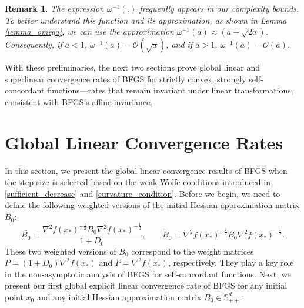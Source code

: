 \documentclass[11pt,letterpaper]{article}
\newcommand\0{{\Vector{0}}}
\newcommand\1{{\Vector{1}}}
\newtheorem{remark}{Remark}
\numberwithin{assumption}{section}
\numberwithin{definition}{section}
\numberwithin{theorem}{section}
\numberwithin{remark}{section}
\begin{document}
\begin{remark}
  The expression $\omega^{-1}(.)$ frequently appears in our complexity bounds. To better understand this function and its approximation, as shown in Lemma \ref{lemma_omega}, we can use the approximation $\omega^{-1}(a) \approx (a + \sqrt{2a})$. Consequently, if $a < 1$, $\omega^{-1}(a) = \mathcal{O}(\sqrt{a})$, and if $a > 1$, $\omega^{-1}(a) = \mathcal{O}(a)$.
\end{remark}

With these preliminaries, the next two sections prove global linear and superlinear convergence rates of BFGS for strictly convex, strongly self-concordant functions—rates that remain invariant under linear transformations, consistent with BFGS's affine invariance.

\section{Global Linear Convergence Rates}\label{sec:linear}

In this section, we present the global linear convergence results of BFGS when the step size is selected based on the weak Wolfe conditions introduced in \eqref{sufficient_decrease} and \eqref{curvature_condition}. Before we begin, we need to define the following weighted versions of the initial Hessian approximation matrix \( B_0 \):
\begin{equation}\label{def_B_bar}
    \bar{B_0} = \frac{\nabla^2 f(x_*)^{-\frac{1}{2}} B_0 \nabla^2 f(x_*)^{-\frac{1}{2}}}{1 + D_0}, \qquad 
    \tilde{B}_0 = \nabla^2 f(x_*)^{-\frac{1}{2}} B_0 \nabla^2 f(x_*)^{-\frac{1}{2}}.
\end{equation} 
These two weighted versions of \( B_0 \) correspond to the weight matrices \( P = (1 + D_0)\nabla^2 f(x_*) \) and \( P = \nabla^2 f(x_*) \), respectively. They play a key role in the non-asymptotic analysis of BFGS for self-concordant functions. Next, we present our first global explicit linear convergence rate of BFGS for any initial point $x_0$ and any initial Hessian approximation matrix $B_0 \in \mathbb{S}^d_{++}$. %
\end{document}
